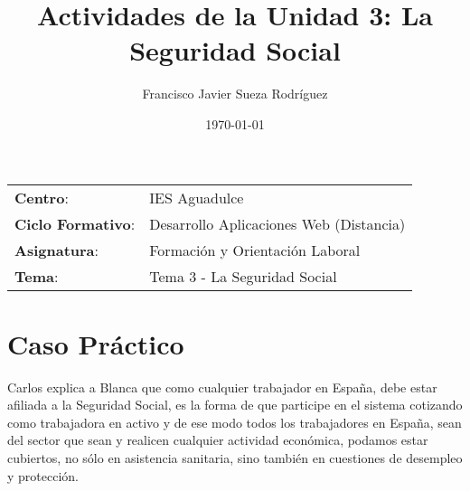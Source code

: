


\title{
\vspace{10ex}
\normalfont \normalsize
\huge \textbf{Actividades de la Unidad 3: La Seguridad Social}
}
\author{Francisco Javier Sueza Rodríguez}
\date{\normalsize\today}



\maketitle

\thispagestyle{empty}

\vspace{75ex}

\begin{center}
    \begin{tabular}{l l}
        \textbf{Centro}: & IES Aguadulce \\
        \textbf{Ciclo Formativo}: & Desarrollo Aplicaciones Web (Distancia)\\
        \textbf{Asignatura}: & Formación y Orientación Laboral\\
        \textbf{Tema}: & Tema 3 -  La Seguridad Social\\
    \end{tabular}
\end{center}

\newpage

\tableofcontents

\newpage
\section{Caso Práctico}
Carlos explica a Blanca que como cualquier trabajador en España, debe estar afiliada a la Seguridad Social, es la forma de que participe en el sistema cotizando como trabajadora en activo y de ese modo todos los trabajadores en España, sean del sector que sean y realicen cualquier actividad económica, podamos estar cubiertos, no sólo en asistencia sanitaria, sino también en cuestiones de desempleo y protección.

